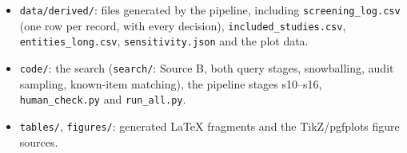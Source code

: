 \begin{itemize}
  \item \texttt{data/derived/}: files generated by the pipeline, including \texttt{screening\_log.csv} (one row per record, with every decision), \texttt{included\_studies.csv}, \texttt{entities\_long.csv}, \texttt{sensitivity.json} and the plot data.
  \item \texttt{code/}: the search (\texttt{search/}: Source B, both query stages, snowballing, audit sampling, known-item matching), the pipeline stages s10--s16, \texttt{human\_check.py} and \texttt{run\_all.py}.
  \item \texttt{tables/}, \texttt{figures/}: generated \LaTeX{} fragments and the TikZ/pgfplots figure sources.
\end{itemize}

